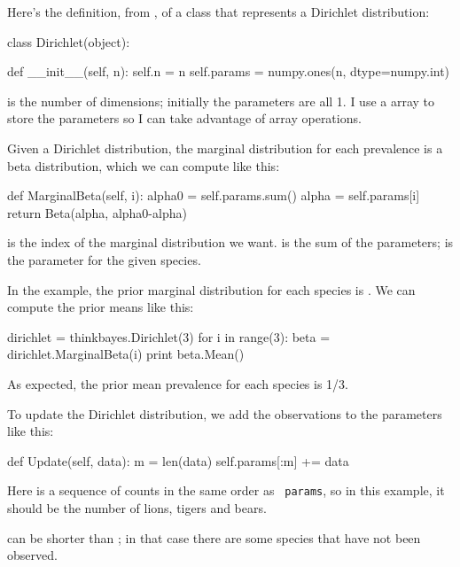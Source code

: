 \documentclass[12pt]{book}
\theoremstyle{exercise}
\begin{document}
Here's the definition, from , of a class that
represents a Dirichlet distribution:

\begin{code}
class Dirichlet(object):

    def __init__(self, n):
        self.n = n
        self.params = numpy.ones(n, dtype=numpy.int)
\end{code}

 is the number of dimensions; initially the parameters
are all 1.  I use a  array to store the parameters
so I can take advantage of array operations.

Given a Dirichlet distribution, the marginal distribution
for each prevalence is a beta distribution, which we can
compute like this:

\begin{code}
    def MarginalBeta(self, i):
        alpha0 = self.params.sum()
        alpha = self.params[i]
        return Beta(alpha, alpha0-alpha)
\end{code}

 is the index of the marginal distribution we want.
 is the sum of the parameters;  is the
parameter for the given species.

In the example, the prior marginal distribution for each species
is .  We can compute the prior means like
this:

\begin{code}
    dirichlet = thinkbayes.Dirichlet(3)
    for i in range(3):
        beta = dirichlet.MarginalBeta(i)
        print beta.Mean()
\end{code}

As expected, the prior mean prevalence for each species is 1/3.

To update the Dirichlet distribution, we add the
observations to the parameters like this:

\begin{code}
    def Update(self, data):
        m = len(data)
        self.params[:m] += data
\end{code}

Here  is a sequence of counts in the same order as {\tt
  params}, so in this example, it should be the number of lions,
tigers and bears.

 can be shorter than ; in that
case there are some species that have not been
observed.
\end{document}
